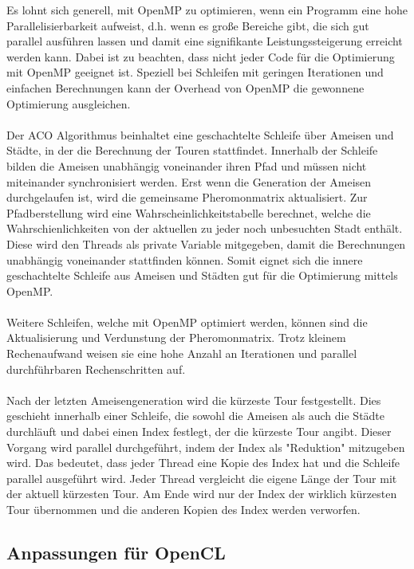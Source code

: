 Es lohnt sich generell, mit OpenMP zu optimieren, wenn ein Programm eine hohe Parallelisierbarkeit aufweist, d.h. wenn es große Bereiche gibt, 
die sich gut parallel ausführen lassen und damit eine signifikante Leistungssteigerung erreicht werden kann.
Dabei ist zu beachten, dass nicht jeder Code für die Optimierung mit OpenMP geeignet ist. Speziell bei Schleifen mit geringen Iterationen und einfachen Berechnungen kann der Overhead von OpenMP die gewonnene Optimierung ausgleichen.
\\\\
Der ACO Algorithmus beinhaltet eine geschachtelte Schleife über Ameisen und Städte, in der die Berechnung der Touren stattfindet.
Innerhalb der Schleife bilden die Ameisen unabhängig voneinander ihren Pfad und müssen nicht miteinander synchronisiert werden.
Erst wenn die Generation der Ameisen durchgelaufen ist, wird die gemeinsame Pheromonmatrix aktualisiert.
Zur Pfadberstellung wird eine Wahrscheinlichkeitstabelle berechnet, welche die Wahrschienlichkeiten von der aktuellen zu jeder noch unbesuchten Stadt enthält.
Diese wird den Threads als private Variable mitgegeben, damit die Berechnungen unabhängig voneinander stattfinden können.
Somit eignet sich die innere geschachtelte Schleife aus Ameisen und Städten gut für die Optimierung mittels OpenMP.
\\\\
Weitere Schleifen, welche mit OpenMP optimiert werden, können sind die Aktualisierung und Verdunstung der Pheromonmatrix.
Trotz kleinem Rechenaufwand weisen sie eine hohe Anzahl an Iterationen und parallel durchführbaren Rechenschritten auf.
\\\\
Nach der letzten Ameisengeneration wird die kürzeste Tour festgestellt.
Dies geschieht innerhalb einer Schleife, die sowohl die Ameisen als auch die Städte durchläuft und dabei einen Index festlegt, der die kürzeste Tour angibt. 
Dieser Vorgang wird parallel durchgeführt, indem der Index als "Reduktion" mitzugeben wird. 
Das bedeutet, dass jeder Thread eine Kopie des Index hat und die Schleife parallel ausgeführt wird. 
Jeder Thread vergleicht die eigene Länge der Tour mit der aktuell kürzesten Tour. 
Am Ende wird nur der Index der wirklich kürzesten Tour übernommen und die anderen Kopien des Index werden verworfen.

\subsection{Anpassungen für OpenCL}

